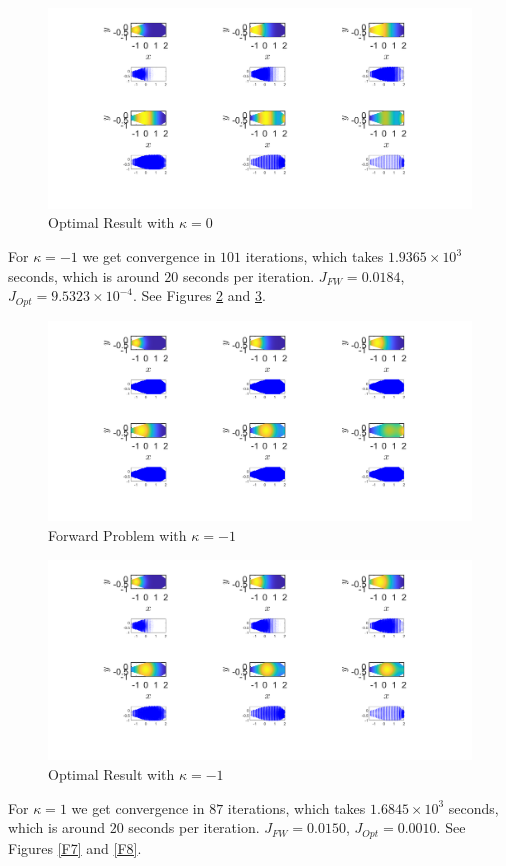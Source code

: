 \documentclass[11pt, a4paper]{article}
\theoremstyle{definition}
\begin{document}
	\begin{figure}[h]
		\centering
		\includegraphics[scale=0.35]{OptChannelk0.png}
		\caption{Optimal Result with $\kappa = 0$} 
		\label{F10}
	\end{figure}
	For $\kappa = -1$ we get convergence in $101$ iterations, which takes $1.9365 \times 10^3$ seconds, which is around $20$ seconds per iteration. $J_{FW} = 0.0184$, $J_{Opt} = 9.5323 \times 10^{-4}$. See Figures \ref{F5} and \ref{F6}.
	\begin{figure}[h]
		\centering
		\includegraphics[scale=0.35]{FWChannelkn1.png}
		\caption{Forward Problem with $\kappa = -1$} 
		\label{F5}
	\end{figure}
	
	\begin{figure}[h]
		\centering
		\includegraphics[scale=0.35]{OptChannelkn1.png}
		\caption{Optimal Result with $\kappa = -1$} 
		\label{F6}
	\end{figure}
	For $\kappa = 1$ we get convergence in $87$ iterations, which takes $1.6845 \times 10^3$ seconds, which is around $20$ seconds per iteration. $J_{FW} = 0.0150$, $J_{Opt} = 0.0010$. See Figures \ref{F7} and \ref{F8}.
		
\end{document}
